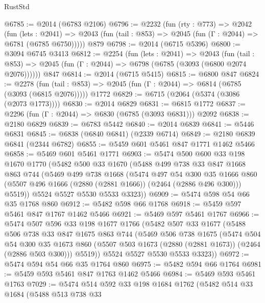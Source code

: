 \begin{lexlean}{RustStd}
\begin{coremodule}
@6785 := @2014 (@6783 @2106)
@6796 := @2232
    (fun (rty : @773) =>
    @2042
      (fun (lets : @2041) =>
      @2043 (fun (tail : @853) => @2045 (fun (Γ : @2044) => @6781 (@6785 @6750)))))
    @879
@6798 := @2014 (@6715 @5396)
@6800 := @3094 @6745 @3413
@6812 := @2254
    (fun (lets : @2041) =>
    @2043
      (fun (tail : @853) => @2045 (fun (Γ : @2044) => @6798 (@6785 (@3093 (@6800 @2074 @2076))))))
    @847
@6814 := @2014 (@6715 @5415)
@6815 := @6800 @847
@6824 := @2278
    (fun (tail : @853) => @2045 (fun (Γ : @2044) => @6814 (@6785 (@3093 (@6815 @2076)))))
    @1772
@6829 := @6715 (@2064 (@5374 (@3086 (@2073 @1773))))
@6830 := @2014 @6829
@6831 := @6815 @1772
@6837 := @2296 (fun (Γ : @2044) => @6830 (@6785 (@3093 @6831))) @2092
@6838 := @2180 @6829
@6839 := @6783 @5442
@6840 := @2014 @6839
@6841 := @5446 @6831
@6845 := @6838 (@6840 @6841) (@2339 @6714)
@6849 := @2180 @6839 @6841 (@2344 @6782)
@6855 := @5459 @601 @5461 @847 @1771 @1462 @5466
@6858 := @5469 @601 @5461 @1771
@6903 := @5474
    @500
    @600
    @33
    @198
    @1670
    @1770
    (@5482
      @500
      @33
      @1670
      (@5488
        @499
        @738
        @33
        @847
        @1668
        @863
        @744
        (@5469
          @499
          @738
          @1668
          (@5474
            @497
            @54
            @300
            @35
            @1666
            @860
            (@5507 @496 @1666 (@2880 (@2881 @1666)) (@2464 (@2886 @496 @300)))
            @5519))
        @5524
        @5527
        @5530
        @5533
        @3323))
@6909 := @5474 @598 @54 @66 @35 @1768 @860
@6912 := @5482 @598 @66 @1768
@6918 := @5459 @597 @5461 @847 @1767 @1462 @5466
@6921 := @5469 @597 @5461 @1767
@6966 := @5474
    @507
    @596
    @33
    @198
    @1677
    @1766
    (@5482
      @507
      @33
      @1677
      (@5488
        @506
        @738
        @33
        @847
        @1675
        @863
        @744
        (@5469
          @506
          @738
          @1675
          (@5474
            @504
            @54
            @300
            @35
            @1673
            @860
            (@5507 @503 @1673 (@2880 (@2881 @1673)) (@2464 (@2886 @503 @300)))
            @5519))
        @5524
        @5527
        @5530
        @5533
        @3323))
@6972 := @5474 @594 @54 @66 @35 @1764 @860
@6975 := @5482 @594 @66 @1764
@6981 := @5459 @593 @5461 @847 @1763 @1462 @5466
@6984 := @5469 @593 @5461 @1763
@7029 := @5474
    @514
    @592
    @33
    @198
    @1684
    @1762
    (@5482
      @514
      @33
      @1684
      (@5488
        @513
        @738
        @33

\end{coremodule}
\end{lexlean}
